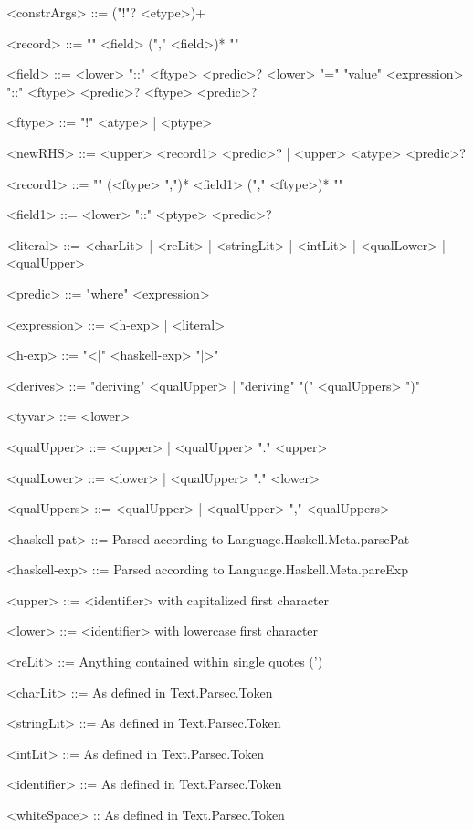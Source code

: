 \documentclass{article}
\begin{document}
\begin{grammar}
<constrArgs> ::= ("!"? <etype>)+

<record>     ::= "{" <field> ("," <field>)* "}"

<field>       ::= <lower> "::" <ftype> <predic>? 
             \alt  <lower> "=" "value" <expression> "::" <ftype> <predic>?
             \alt  <ftype> <predic>?

<ftype>      ::= "!" <atype> | <ptype>

<newRHS>     ::= <upper> <record1> <predic>? | <upper> <atype> <predic>?

<record1>    ::= "{" (<ftype> ",")* <field1> ("," <ftype>)* "}"

<field1>      ::= <lower> "::" <ptype> <predic>?

<literal>    ::= <charLit> | <reLit> | <stringLit> | <intLit> | <qualLower> | <qualUpper>

<predic> ::= "where" <expression>

<expression> ::= <h-exp> | <literal>

<h-exp>      ::= "<|" <haskell-exp> "|>"

<derives> ::= "deriving" <qualUpper> | "deriving" "(" <qualUppers> ")"

<tyvar> ::= <lower>

<qualUpper> ::= <upper> | <qualUpper> "." <upper>

<qualLower> ::= <lower> | <qualUpper> "." <lower>

<qualUppers> ::= <qualUpper> | <qualUpper> "," <qualUppers>

<haskell-pat> ::= Parsed according to Language.Haskell.Meta.parsePat

<haskell-exp> ::= Parsed according to Language.Haskell.Meta.pareExp

<upper> ::= <identifier> with capitalized first character

<lower> ::= <identifier> with lowercase first character

<reLit> ::= Anything contained within single quotes (')

<charLit> ::=  As defined in Text.Parsec.Token

<stringLit>  ::= As defined in Text.Parsec.Token

<intLit> ::= As defined in Text.Parsec.Token

<identifier> ::= As defined in Text.Parsec.Token

<whiteSpace> :: As defined in Text.Parsec.Token
\end{grammar}
\end{document}

